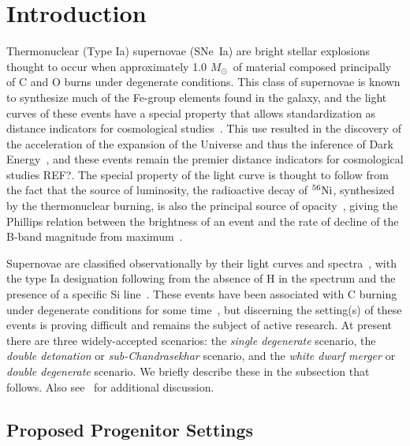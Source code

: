 \documentclass[iop,apj]{emulateapj}
\newcommand{\SNeIa}{SNe~Ia}
\newcommand{\Ni}[1]{\ensuremath{{}^{#1}{\rm Ni}}}
\newcommand{\Msun}{\ensuremath{M_\odot}}
\newcommand\redst{\bgroup\markoverwith{\textcolor{red}{\rule[0.5ex]{2pt}{0.4pt}}}\ULon}
\begin{document}
\section{Introduction}
\label{sec:intro}
Thermonuclear (Type Ia) supernovae (\SNeIa) are bright stellar explosions 
thought to occur when approximately 1.0 \Msun\ of material composed principally 
of C and O burns under degenerate conditions. This class of supernovae is
known to synthesize much of the Fe-group elements found in the galaxy, and
the light curves of these events have a special property that allows
standardization \redst{of their light curves and thus use}
as distance indicators for cosmological studies~\citep{phillips:absolute}.
This use resulted in the discovery of the acceleration of the expansion of
the Universe and thus the inference of Dark 
Energy~\citep{riess.filippenko.ea:observational,
perlmutter.aldering.ea:measurements,leibundgut2001}, and these events
remain the premier distance indicators for cosmological studies {\color{red} REF?}. 
The special property of the light curve is thought to follow
from the fact that the source of luminosity, the radioactive decay
of \Ni{56}, synthesized by the thermonuclear burning, is also the
principal source of opacity~\citep{Pinto2001The-type-Ia-sup}, giving
the Phillips relation between the brightness of an event and the
rate of decline of the B-band magnitude from maximum~\citep{phillips:absolute}. 

Supernovae are classified observationally 
by their light curves and spectra~\citep{minkowski41,bertola64,porterfilippenko87,
wheelerharkness1990conf,Fili97}, with the type Ia designation following from
the absence of H in the spectrum and the presence of a specific Si 
line~\citep{filippenko:optical,hillebrandt.niemeyer:type}. These events
have been associated with C burning under degenerate conditions
for some time~\citep{hoylefowler60,arnett.truran.ea:nucleosynthesis},
but discerning the setting(s) of these events is proving difficult
and remains the subject of active research. At present there are three
widely-accepted scenarios: the {\em single degenerate} scenario,
the {\em double detonation} or {\em sub-Chandrasekhar} scenario, and
the {\em white dwarf merger} or {\em double degenerate} scenario.
We briefly describe these in the subsection that follows.
Also see~\citet{hillebrandt.niemeyer:type,howell2011,hillebrandtetal2013,calderetal2013,roepkesim2018}
for additional discussion.

\subsection{Proposed Progenitor Settings}
\end{document}
